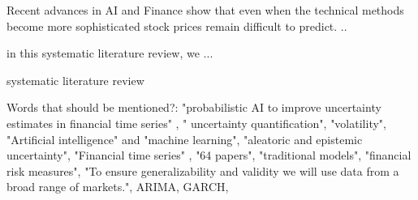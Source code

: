 \label{sec:abstract}
Recent advances in AI and Finance show that even when the technical methods become more sophisticated stock prices remain difficult to predict. ..

in this systematic literature review, we ...

systematic literature review

Words that should be mentioned?: "probabilistic AI to improve uncertainty estimates in financial time series" , " uncertainty quantification", "volatility", "Artificial intelligence" and "machine learning", "aleatoric and epistemic uncertainty", "Financial time series" , "64 papers", "traditional models", "financial risk measures", "To ensure generalizability and
validity we will use data from a broad range of markets.", ARIMA, GARCH, 
